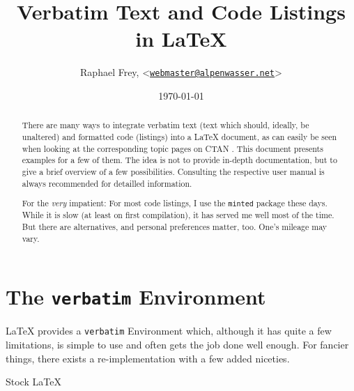 \documentclass[article,a4paper,oneside,10pt]{memoir}
\title{\textsf{\Huge Verbatim Text and Code Listings in \LaTeX}}
\author{Raphael Frey, <\href{mailto:webmaster@alpenwasser.net}{\nolinkurl{webmaster@alpenwasser.net}}>}
\date{\vspace{1em}\today}
\makeatletter
\renewcommand{\section}{%
  \sechook%
  \@startsection{section}{1}%
      {\secindent}%
      {\beforesecskip}%
      {\aftersecskip}%
      {\sffamily\secheadstyle}} %
\newcommand\code[1]{\texttt{#1}}
\makeatother
\begin{document}

\maketitle

\begin{abstract}
    There  are  many ways  to  integrate  verbatim  text (text  which  should,
    ideally,  be unaltered)  and  formatted code  (listings)  into a  \LaTeX{}
    document,  as  can  easily  be  seen when  looking  at  the  corresponding
    topic  pages on  CTAN \cite{ctan:topic:listings,ctan:topic:verbatim}. This
    document  presents  examples  for  a  few of  them. The  idea  is  not  to
    provide  in-depth  documentation,  but  to  give a  brief  overview  of  a
    few  possibilities.   Consulting  the  respective user  manual  is  always
    recommended for detailled information.

    For  the  \emph{very}  impatient: For  most   code  listings,  I  use  the
    \code{minted}  package these  days. While it  is slow  (at least  on first
    compilation),  it has  served  me well  most of  the  time. But there  are
    alternatives,  and personal  preferences  matter,  too. One's mileage  may
    vary.
\end{abstract}

\tableofcontents*


\newpage
\chapter{The \code{verbatim} Environment}
\label{chap:verbatim}

\LaTeX{} provides a \code{verbatim} Environment which, although it has quite a
few limitations, is simple to use and often gets the job done well enough. For
fancier things, there exists a re-implementation with a few added niceties.


\section{Stock \LaTeX}
\label{sec:verbatim:stock}
\end{document}
